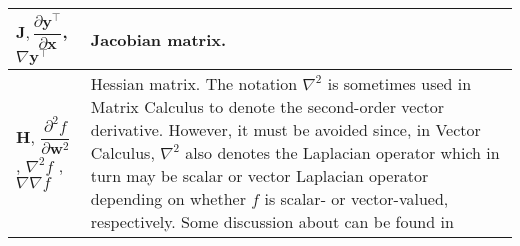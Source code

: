 \begin{xltabular}{\textwidth}{XX}
	\(\mathbf{J}, \dfrac{\partial \mathbf{y}^{\top}}{\partial \mathbf{x}}\), \(\nabla \mathbf{y}^\top\) \cite{haykinNeuralNetworksLearning2009}                                            & Jacobian matrix.                                                                                                                                                                                                                                                                                                                                                                                                                           \\ \hline
	\(\mathbf{H}\), \(\dfrac{\partial^2 f}{\partial \mathbf{w}^2}\), \(\nabla^2 f\) \cite{haykinNeuralNetworksLearning2009}, \(\nabla\nabla f\) \cite{bishopPatternRecognitionMachine2006} & Hessian matrix. The notation \(\nabla^2\) is sometimes used in Matrix Calculus to denote the second-order vector derivative. However, it must be avoided since, in Vector Calculus, \(\nabla^2\) also denotes the Laplacian operator which in turn may be scalar or vector Laplacian operator depending on whether \(f\) is scalar- or vector-valued, respectively. Some discussion about can be found in \cite{4693212, 1353761, 4560326} \\ \hline
\end{xltabular}

